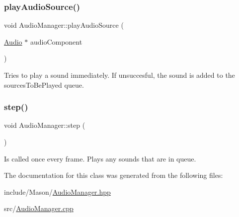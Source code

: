\subsubsection{\texorpdfstring{play\+Audio\+Source()}{playAudioSource()}}
{\footnotesize\ttfamily void Audio\+Manager\+::play\+Audio\+Source (\begin{DoxyParamCaption}\item[{\hyperlink{class_mason_1_1_audio}{Audio} $\ast$}]{audio\+Component }\end{DoxyParamCaption})}



Tries to play a sound immediately. If unsuccesful, the sound is added to the sources\+To\+Be\+Played queue. 

\hypertarget{class_mason_1_1_audio_manager_a81eb2ff2bc2d1242e532c208b32d17ec}{}\label{class_mason_1_1_audio_manager_a81eb2ff2bc2d1242e532c208b32d17ec} 
\subsubsection{\texorpdfstring{step()}{step()}}
{\footnotesize\ttfamily void Audio\+Manager\+::step (\begin{DoxyParamCaption}{ }\end{DoxyParamCaption})}



Is called once every frame. Plays any sounds that are in queue. 



The documentation for this class was generated from the following files\+:\begin{DoxyCompactItemize}
\item 
include/\+Mason/\hyperlink{_audio_manager_8hpp}{Audio\+Manager.\+hpp}\item 
src/\hyperlink{_audio_manager_8cpp}{Audio\+Manager.\+cpp}\end{DoxyCompactItemize}
